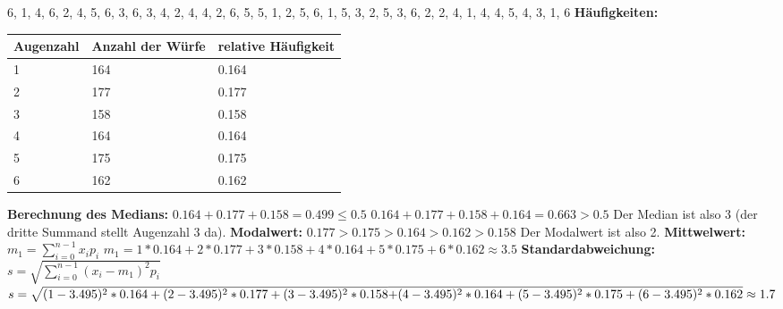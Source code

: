 6, 1, 4, 6, 2, 4, 5, 6, 3, 6, 3, 4, 2, 4, 4, 2, 6, 5, 5, 1, 2, 5, 6, 1, 5, 3, 2, 5, 3, 6, 2, 2, 4, 1, 4, 4, 5, 4, 3, 1, 6 \newline
	\textbf{Häufigkeiten:}
	\begin{center}
		\begin{tabular}{ | l | l | l | }
			\hline
			Augenzahl & Anzahl der Würfe & relative Häufigkeit \\ \hline
			1 & 164 & 0.164 \\ \hline
			2 & 177 & 0.177 \\ \hline
			3 & 158 & 0.158 \\ \hline
			4 & 164 & 0.164 \\ \hline
			5 & 175 & 0.175 \\ \hline
			6 & 162 & 0.162 \\ \hline
		\end{tabular}  
	\end{center}
	\textbf{Berechnung des Medians:} \newline
	$0.164 + 0.177 + 0.158 = 0.499 \leq 0.5$ \newline
	$0.164 + 0.177 + 0.158 + 0.164 = 0.663 > 0.5$ \newline
	Der Median ist also 3 (der dritte Summand stellt Augenzahl 3 da). \newline
	\textbf{Modalwert:} \newline
	$0.177 > 0.175 > 0.164 > 0.162 > 0.158$ \newline
	Der Modalwert ist also 2. \newline
	\textbf{Mittwelwert:} \newline 
	$m_1 = \sum_{i=0}^{n-1} x_i p_i$ \newline
	$m_1 = 1*0.164 + 2*0.177 + 3*0.158 + 4*0.164 + 5*0.175 + 6*0.162 \approx 3.5$ \newline
	\textbf{Standardabweichung:} \newline
	$s = \sqrt{\sum_{i=0}^{n-1} (x_i-m_1)^2 p_i}$ \newline
	$s = \sqrt{(1-3.495)^2*0.164 + (2-3.495)^2*0.177 + (3-3.495)^2*0.158} \\\overline{+ (4-3.495)^2*0.164 + (5-3.495)^2*0.175 + (6-3.495)^2*0.162} \approx 1.7$ \newpage
